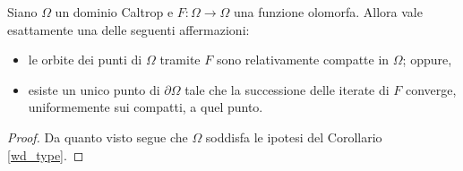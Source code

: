 \begin{cor}
    Siano $\Omega$ un dominio Caltrop e $F:\Omega \longrightarrow \Omega$ una funzione olomorfa. Allora vale esattamente una delle seguenti affermazioni:
    \begin{itemize}
        \item le orbite dei punti di $\Omega$ tramite $F$ sono relativamente compatte in $\Omega$; oppure,
        \item esiste un unico punto di $\partial \Omega$ tale che la successione delle iterate di $F$ converge, uniformemente sui compatti, a quel punto.
    \end{itemize}
\end{cor}

\begin{proof}
    Da quanto visto segue che $\Omega$ soddisfa le ipotesi del Corollario \ref{wd_type}.
\end{proof}